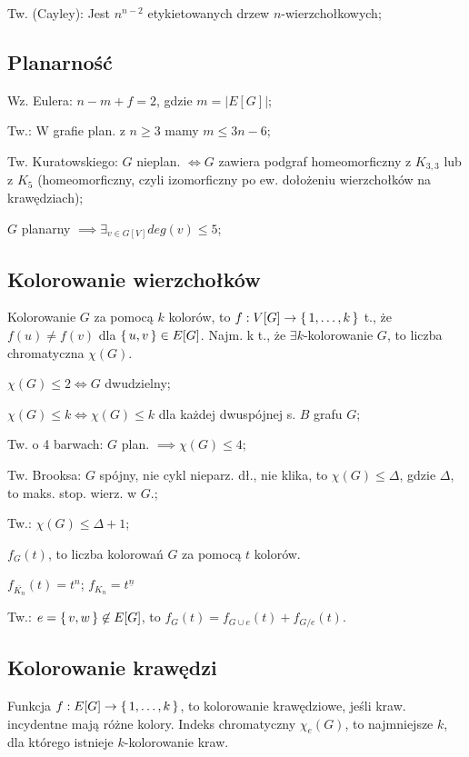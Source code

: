 Tw. (Cayley): Jest $n^{n-2}$ etykietowanych drzew $n$-wierzchołkowych;

\subsection{Planarność}

Wz. Eulera: $n - m + f = 2$, gdzie $m = |E[G]|$;

Tw.: W grafie plan. z $n \geq 3$ mamy $m \leq 3n -6$;

Tw. Kuratowskiego: $G$ nieplan. $\iff G$ zawiera podgraf homeomorficzny
  z $K_{3,3}$ lub z $K_5$ (homeomorficzny, czyli
  izomorficzny po ew. dołożeniu wierzchołków na krawędziach);

$G$ planarny $\implies \exists_{v \in G[V]} deg(v) \leq 5$;

\subsection{Kolorowanie wierzchołków}

Kolorowanie $G$ za pomocą $k$ kolorów, to
  $f: V[G] \rightarrow \set{1, \dots, k}$ t., że $f(u) \neq f(v)$ dla
  $\set{u, v} \in E[G]$. Najm. k t., że $\exists k$-kolorowanie $G$, to liczba
  chromatyczna $\chi (G)$.

$\chi(G) \leq 2 \Leftrightarrow G$ dwudzielny;

$\chi(G) \leq k \Leftrightarrow \chi(G) \leq k$ dla każdej dwuspójnej s. $B$
  grafu $G$;

Tw. o 4 barwach: $G$ plan. $\implies\chi(G)\leq 4$;

Tw. Brooksa: $G$ spójny, nie cykl nieparz. dł., nie klika, to
  $\chi(G) \leq \Delta$, gdzie $\Delta$, to maks. stop. wierz. w $G$.;

Tw.: $\chi(G) \leq \Delta + 1$;

$f_G(t)$, to liczba kolorowań $G$ za pomocą $t$ kolorów.

$f_{\overline{K_n}}(t) = t^n$; $f_{K_n} = t^{\underline{n}}$

Tw.: $e = \set{v, w} \not\in E[G]$, to $f_G(t)=f_{G\cup e}(t) + f_{G/e}(t)$.

\subsection{Kolorowanie krawędzi}

Funkcja $f: E[G] \rightarrow \set{1, \dots, k}$, to kolorowanie krawędziowe,
  jeśli kraw. incydentne mają różne kolory. Indeks chromatyczny $\chi_e(G)$, to
  najmniejsze $k$, dla którego istnieje $k$-kolorowanie kraw.

